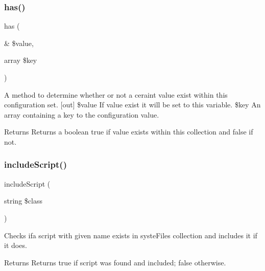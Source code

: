 \subsubsection{\texorpdfstring{has()}{has()}}
{\footnotesize\ttfamily has (\begin{DoxyParamCaption}\item[{\&}]{\$value,  }\item[{array}]{\$key }\end{DoxyParamCaption})}

A method to determine whether or not a ceraint value exist within this configuration set. \mbox{[}out\mbox{]} \$value If value exist it will be set to this variable.  \$key An array containing a key to the configuration value. \begin{DoxyReturn}{Returns}
Returns a boolean true if value exists within this collection and false if not. 
\end{DoxyReturn}

\mbox{\label{class_lora_1_1_configuration_a9b14657d7ca60617425e9fb5d81379a3}} 
\subsubsection{\texorpdfstring{include\+Script()}{includeScript()}}
{\footnotesize\ttfamily include\+Script (\begin{DoxyParamCaption}\item[{string}]{\$class }\end{DoxyParamCaption})}

Checks ifa script with given name exists in syste\+Files collection and includes it if it does. \begin{DoxyReturn}{Returns}
Returns true if script was found and included; false otherwise. 
\end{DoxyReturn}

